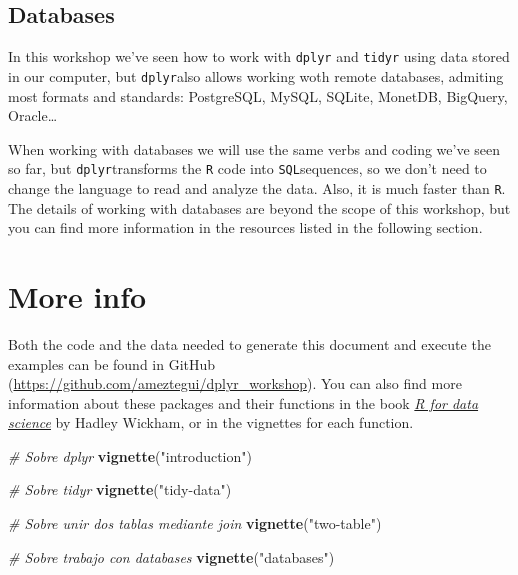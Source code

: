 \documentclass[]{article}
\newenvironment{Shaded}{\begin{snugshade}}{\end{snugshade}}
\newcommand{\KeywordTok}[1]{\textcolor[rgb]{0.13,0.29,0.53}{\textbf{#1}}}
\newcommand{\StringTok}[1]{\textcolor[rgb]{0.31,0.60,0.02}{#1}}
\newcommand{\CommentTok}[1]{\textcolor[rgb]{0.56,0.35,0.01}{\textit{#1}}}
\newcommand{\NormalTok}[1]{#1}
\begin{document}
\subsection{Databases}\label{databases}

In this workshop we've seen how to work with \texttt{dplyr} and
\texttt{tidyr} using data stored in our computer, but \texttt{dplyr}also
allows working woth remote databases, admiting most formats and
standards: PostgreSQL, MySQL, SQLite, MonetDB, BigQuery, Oracle\ldots{}

When working with databases we will use the same verbs and coding we've
seen so far, but \texttt{dplyr}transforms the \texttt{R} code into
\texttt{SQL}sequences, so we don't need to change the language to read
and analyze the data. Also, it is much faster than \texttt{R}. The
details of working with databases are beyond the scope of this workshop,
but you can find more information in the resources listed in the
following section.

\newpage

\section{More info}\label{more-info}

Both the code and the data needed to generate this document and execute
the examples can be found in GitHub
(\url{https://github.com/ameztegui/dplyr_workshop}). You can also find
more information about these packages and their functions in the book
\emph{\href{http://r4ds.had.co.nz/}{R for data science}} by Hadley
Wickham, or in the vignettes for each function.

\begin{Shaded}
\begin{Highlighting}[]
\CommentTok{# Sobre dplyr}
\KeywordTok{vignette}\NormalTok{(}\StringTok{"introduction"}\NormalTok{)}

\CommentTok{# Sobre tidyr}
\KeywordTok{vignette}\NormalTok{(}\StringTok{"tidy-data"}\NormalTok{)}

\CommentTok{# Sobre unir dos tablas mediante join}
\KeywordTok{vignette}\NormalTok{(}\StringTok{"two-table"}\NormalTok{)}

\CommentTok{# Sobre trabajo con databases}
\KeywordTok{vignette}\NormalTok{(}\StringTok{"databases"}\NormalTok{)}
\end{Highlighting}
\end{Shaded}
\end{document}

